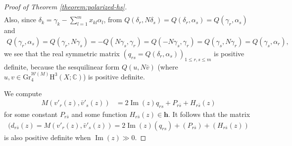 \begin{proof}[Proof of Theorem \ref{theorem:polarized-hs}]
\begin{eqnarray*}
\end{eqnarray*}
Also, since \(\delta_{k}=\gamma_{k}-\sum_{l=1}^{m}x_{kl}\alpha_{l}\), from
\(Q(\delta_{r},N\delta_{s})=
Q(\delta_{r},\alpha_{s})=Q(\gamma_{r},\alpha_{s})\) and
\begin{eqnarray*}
Q(\gamma_{r},\alpha_{s})=Q(\gamma_{r},N\gamma_{s})=
-Q(N\gamma_{s},\gamma_{r})=Q(-N\gamma_{s},\gamma_{r})
=Q(\gamma_{s},N\gamma_{r})=Q(\gamma_{s},\alpha_{r}),
\end{eqnarray*}
we see that the real symmetric matrix \((q_{rs}=
Q(\delta_{r},\alpha_{s}))_{1\le r,s\le m}\) is 
positive definite, because the sesquilinear form
\(Q(u,N\bar{v})\) (where \(u,v\in 
\mathrm{Gr}_{4}^{\mathcal{W}(M)}\mathrm{H}^{3}(X;\mathbb{C})\))
is positive definite.

We compute
\begin{align*}
M(v'_{r}(z),\bar{v}'_{s}(z))&=2\operatorname{Im}(z) q_{rs} + P_{r\bar{s}} + H_{r\bar{s}}(z)
\end{align*}
for some constant \(P_{r\bar{s}}\) and some function \(H_{r\bar{s}}(z)\in\mathbf{h}\). 
It follows that the matrix
\begin{eqnarray*}
(d_{r\bar{s}} (z)=M(v'_{r}(z),\bar{v}'_{s}(z))=2\operatorname{Im}(z) 
(q_{rs}) + (P_{r\bar{s}}) + (H_{r\bar{s}}(z))
\end{eqnarray*}
is also positive definite when \(\operatorname{Im}(z)\gg 0\).


\end{proof}
